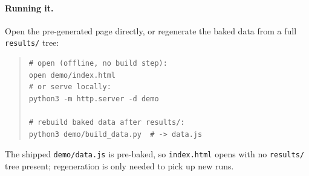\documentclass[11pt]{article}
\begin{document}
\paragraph{Running it.} Open the pre-generated page directly, or regenerate the baked data from a full \texttt{results/} tree:
\begin{quote}
{\small
\begin{verbatim}
# open (offline, no build step):
open demo/index.html
# or serve locally:
python3 -m http.server -d demo

# rebuild baked data after results/:
python3 demo/build_data.py  # -> data.js
\end{verbatim}
}
\end{quote}
The shipped \texttt{demo/data.js} is pre-baked, so \texttt{index.html} opens with no \texttt{results/} tree present; regeneration is only needed to pick up new runs.
\end{document}
